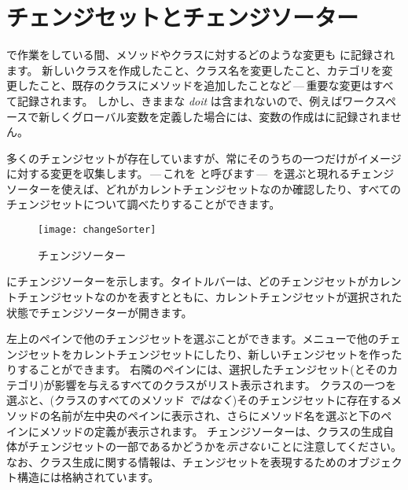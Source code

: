 \documentclass[a4paper,10pt,twoside]{book}
\begin{document}

\section{チェンジセットとチェンジソーター}

\pharo で作業をしている間、メソッドやクラスに対するどのような変更も  に記録されます。
新しいクラスを作成したこと、クラス名を変更したこと、カテゴリを変更したこと、既存のクラスにメソッドを追加したことなど\,---\,重要な変更はすべて記録されます。
しかし、きままな \emph{doit} は含まれないので、例えばワークスペースで新しくグローバル変数を定義した場合には、変数の作成はに記録されません。

多くのチェンジセットが存在していますが、常にそのうちの一つだけがイメージに対する変更を収集します。\,---\,これを  と呼びます\,---\,
を選ぶと現れるチェンジソーターを使えば、どれがカレントチェンジセットなのか確認したり、すべてのチェンジセットについて調べたりすることができます。

\begin{figure}[btp]
\begin{center}
\texttt{[image: changeSorter]}
\end{center}
\caption{チェンジソーター}
\end{figure}

 にチェンジソーターを示します。タイトルバーは、どのチェンジセットがカレントチェンジセットなのかを表すとともに、カレントチェンジセットが選択された状態でチェンジソーターが開きます。

左上のペインで他のチェンジセットを選ぶことができます。\actclick メニューで他のチェンジセットをカレントチェンジセットにしたり、新しいチェンジセットを作ったりすることができます。
右隣のペインには、選択したチェンジセット(とそのカテゴリ)が影響を与えるすべてのクラスがリスト表示されます。
クラスの一つを選ぶと、(クラスのすべてのメソッド \emph{ではなく})そのチェンジセットに存在するメソッドの名前が左中央のペインに表示され、さらにメソッド名を選ぶと下のペインにメソッドの定義が表示されます。
チェンジソーターは、クラスの生成自体がチェンジセットの一部であるかどうかを\emph{示さない}ことに注意してください。なお、クラス生成に関する情報は、チェンジセットを表現するためのオブジェクト構造には格納されています。
\end{document}
